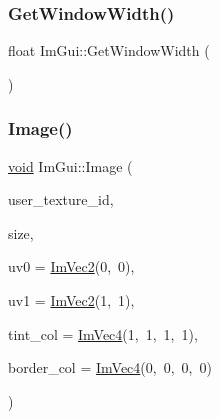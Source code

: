 \subsubsection{\texorpdfstring{Get\+Window\+Width()}{GetWindowWidth()}}
{\footnotesize\ttfamily float Im\+Gui\+::\+Get\+Window\+Width (\begin{DoxyParamCaption}{ }\end{DoxyParamCaption})}

\mbox{\label{namespaceImGui_ad8705ac3b718c1b2e84e7b8c34f90249}} 
\subsubsection{\texorpdfstring{Image()}{Image()}}
{\footnotesize\ttfamily \hyperlink{imgui__impl__opengl3__loader_8h_ac668e7cffd9e2e9cfee428b9b2f34fa7}{void} Im\+Gui\+::\+Image (\begin{DoxyParamCaption}\item[{Im\+Texture\+ID}]{user\+\_\+texture\+\_\+id,  }\item[{const \hyperlink{structImVec2}{Im\+Vec2} \&}]{size,  }\item[{const \hyperlink{structImVec2}{Im\+Vec2} \&}]{uv0 = {\ttfamily \hyperlink{structImVec2}{Im\+Vec2}(0,~0)},  }\item[{const \hyperlink{structImVec2}{Im\+Vec2} \&}]{uv1 = {\ttfamily \hyperlink{structImVec2}{Im\+Vec2}(1,~1)},  }\item[{const \hyperlink{structImVec4}{Im\+Vec4} \&}]{tint\+\_\+col = {\ttfamily \hyperlink{structImVec4}{Im\+Vec4}(1,~1,~1,~1)},  }\item[{const \hyperlink{structImVec4}{Im\+Vec4} \&}]{border\+\_\+col = {\ttfamily \hyperlink{structImVec4}{Im\+Vec4}(0,~0,~0,~0)} }\end{DoxyParamCaption})}

\mbox{\label{namespaceImGui_a33dfbecf9f016b0fc9b317f99f123f9b}} 
